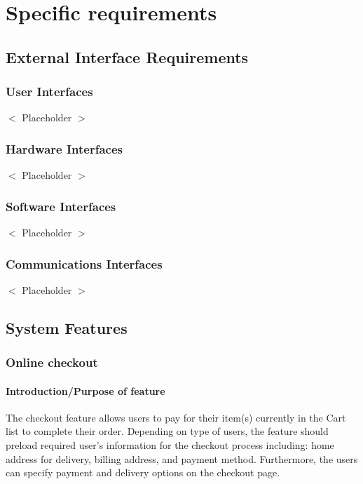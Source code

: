 \documentclass{scrreprt}
\theoremstyle{funreq}
\begin{document}
{\let\clearpage\relax 
\chapter{Specific requirements}}

\section{External Interface Requirements}

\subsection{User Interfaces}
$<$ Placeholder $>$

\subsection{Hardware Interfaces}
$<$ Placeholder $>$

\subsection{Software Interfaces}
$<$ Placeholder $>$

\subsection{Communications Interfaces}
$<$ Placeholder $>$

\section{System Features}



\subsection{Online checkout}


	
\subsubsection{Introduction/Purpose of feature}
The checkout feature allows users to pay for their item(s) currently in the Cart list to complete their order. Depending on type of users, the feature should preload required user’s information for the checkout process including: home address for delivery, billing address, and payment method. Furthermore, the users can specify payment and delivery options on the checkout page. 
\end{document}
